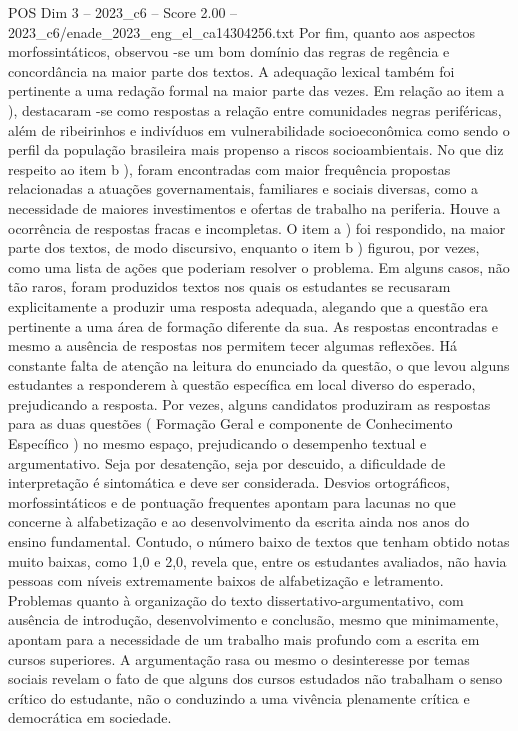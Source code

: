\begin{textsample}{POS Dim 3 – 2023\_c6 – Score 2.00 – 2023\_c6/enade\_2023\_eng\_el\_ca14304256.txt}
Por fim, quanto aos aspectos morfossintáticos, observou -se um bom domínio das regras de regência e concordância na maior parte dos textos.
A adequação lexical também foi pertinente a uma redação formal na maior parte das vezes.
Em relação ao item a ), destacaram -se como respostas a relação entre comunidades negras periféricas, além de ribeirinhos e indivíduos em vulnerabilidade socioeconômica como sendo o perfil da população brasileira mais propenso a riscos socioambientais.
No que diz respeito ao item b ), foram encontradas com maior frequência propostas relacionadas a atuações governamentais, familiares e sociais diversas, como a necessidade de maiores investimentos e ofertas de trabalho na periferia.
Houve a ocorrência de respostas fracas e incompletas.
O item a ) foi respondido, na maior parte dos textos, de modo discursivo, enquanto o item b ) figurou, por vezes, como uma lista de ações que poderiam resolver o problema.
Em alguns casos, não tão raros, foram produzidos textos nos quais os estudantes se recusaram explicitamente a produzir uma resposta adequada, alegando que a questão era pertinente a uma área de formação diferente da sua.
As respostas encontradas e mesmo a ausência de respostas nos permitem tecer algumas reflexões.
Há constante falta de atenção na leitura do enunciado da questão, o que levou alguns estudantes a responderem à questão específica em local diverso do esperado, prejudicando a resposta.
Por vezes, alguns candidatos produziram as respostas para as duas questões ( Formação Geral e componente de Conhecimento Específico ) no mesmo espaço, prejudicando o desempenho textual e argumentativo.
Seja por desatenção, seja por descuido, a dificuldade de interpretação é sintomática e deve ser considerada.
Desvios ortográficos, morfossintáticos e de pontuação frequentes apontam para lacunas no que concerne à alfabetização e ao desenvolvimento da escrita ainda nos anos do ensino fundamental.
Contudo, o número baixo de textos que tenham obtido notas muito baixas, como 1,0 e 2,0, revela que, entre os estudantes avaliados, não havia pessoas com níveis extremamente baixos de alfabetização e letramento.
Problemas quanto à organização do texto dissertativo-argumentativo, com ausência de introdução, desenvolvimento e conclusão, mesmo que minimamente, apontam para a necessidade de um trabalho mais profundo com a escrita em cursos superiores.
A argumentação rasa ou mesmo o desinteresse por temas sociais revelam o fato de que alguns dos cursos estudados não trabalham o senso crítico do estudante, não o conduzindo a uma vivência plenamente crítica e democrática em sociedade.

\end{textsample}
